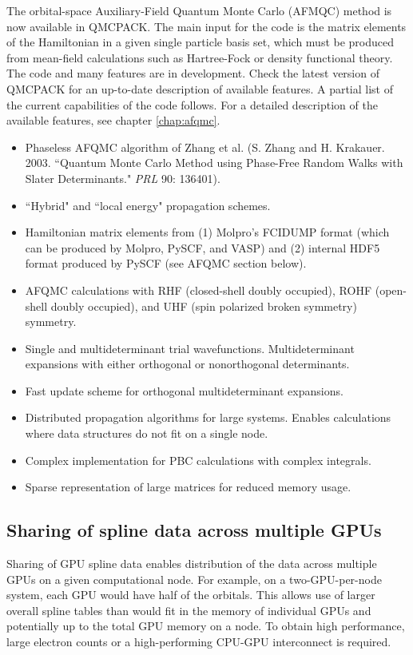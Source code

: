 The orbital-space Auxiliary-Field Quantum Monte Carlo (AFMQC) method is now available in QMCPACK. The main input for the code is the matrix elements of the Hamiltonian in a given single particle basis set, which must be produced from mean-field calculations such as Hartree-Fock or density functional theory. The code and many features are in development. Check the latest version of QMCPACK for an up-to-date description of available features. A partial list of the current capabilities of the code follows. For a detailed description of the available features, see chapter \ref{chap:afqmc}.
 
\begin{itemize}
    \item Phaseless AFQMC algorithm of Zhang et al. (S. Zhang and H. Krakauer. 2003. ``Quantum Monte Carlo Method using Phase-Free Random Walks with Slater Determinants." \textit{PRL} 90: 136401).
    \item ``Hybrid" and ``local energy" propagation schemes.
    \item Hamiltonian matrix elements from (1) Molpro's FCIDUMP format (which can be produced by Molpro, PySCF, and VASP) and (2) internal HDF5 format produced by PySCF (see AFQMC section below).
    \item AFQMC calculations with RHF (closed-shell doubly occupied), ROHF (open-shell doubly occupied), and UHF (spin polarized broken symmetry) symmetry. 
    \item Single and multideterminant trial wavefunctions. Multideterminant expansions with either orthogonal or nonorthogonal determinants. 
    \item Fast update scheme for orthogonal multideterminant expansions.
    \item Distributed propagation algorithms for large systems. Enables calculations where data structures do not fit on a single node.
    \item Complex implementation for PBC calculations with complex integrals.
    \item Sparse representation of large matrices for reduced memory usage.
\end{itemize}

\subsection{Sharing of spline data across multiple GPUs}

Sharing of GPU spline data enables distribution of the data
across multiple GPUs on a given computational node. For example, on a
two-GPU-per-node system, each GPU would have half of the
orbitals. This allows use of larger overall spline tables than would fit in
the memory of individual GPUs and potentially up to
the total GPU memory on a node. To obtain high performance, large
electron counts or a high-performing CPU-GPU interconnect is required.

